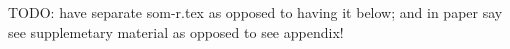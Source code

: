 \documentclass[10pt, letterpaper]{article}
\begin{document}
\begin{spacing}{1.4}
    




TODO: have separate som-r.tex as opposed to having it below; and in paper say
see supplemetary material as opposed to see appendix!







\end{spacing}
\end{document}
